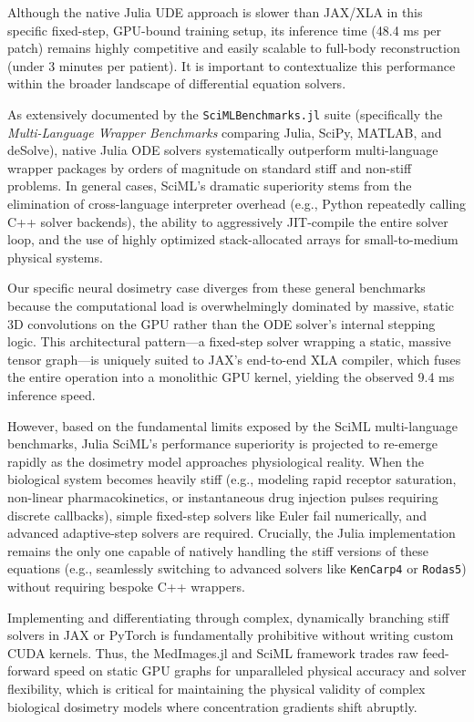 \documentclass[10pt,letterpaper]{article}
\begin{document}
Although the native Julia UDE approach is slower than JAX/XLA in this specific fixed-step, GPU-bound training setup, its inference time (48.4 ms per patch) remains highly competitive and easily scalable to full-body reconstruction (under 3 minutes per patient). It is important to contextualize this performance within the broader landscape of differential equation solvers. 

As extensively documented by the \texttt{SciMLBenchmarks.jl} suite (specifically the \textit{Multi-Language Wrapper Benchmarks} comparing Julia, SciPy, MATLAB, and deSolve), native Julia ODE solvers systematically outperform multi-language wrapper packages by orders of magnitude on standard stiff and non-stiff problems. In general cases, SciML's dramatic superiority stems from the elimination of cross-language interpreter overhead (e.g., Python repeatedly calling C++ solver backends), the ability to aggressively JIT-compile the entire solver loop, and the use of highly optimized stack-allocated arrays for small-to-medium physical systems.

Our specific neural dosimetry case diverges from these general benchmarks because the computational load is overwhelmingly dominated by massive, static 3D convolutions on the GPU rather than the ODE solver's internal stepping logic. This architectural pattern---a fixed-step solver wrapping a static, massive tensor graph---is uniquely suited to JAX's end-to-end XLA compiler, which fuses the entire operation into a monolithic GPU kernel, yielding the observed 9.4 ms inference speed. 

However, based on the fundamental limits exposed by the SciML multi-language benchmarks, Julia SciML's performance superiority is projected to re-emerge rapidly as the dosimetry model approaches physiological reality. When the biological system becomes heavily stiff (e.g., modeling rapid receptor saturation, non-linear pharmacokinetics, or instantaneous drug injection pulses requiring discrete callbacks), simple fixed-step solvers like Euler fail numerically, and advanced adaptive-step solvers are required. Crucially, the Julia implementation remains the only one capable of natively handling the stiff versions of these equations (e.g., seamlessly switching to advanced solvers like \texttt{KenCarp4} or \texttt{Rodas5}) without requiring bespoke C++ wrappers. 

Implementing and differentiating through complex, dynamically branching stiff solvers in JAX or PyTorch is fundamentally prohibitive without writing custom CUDA kernels. Thus, the MedImages.jl and SciML framework trades raw feed-forward speed on static GPU graphs for unparalleled physical accuracy and solver flexibility, which is critical for maintaining the physical validity of complex biological dosimetry models where concentration gradients shift abruptly.
\end{document}

